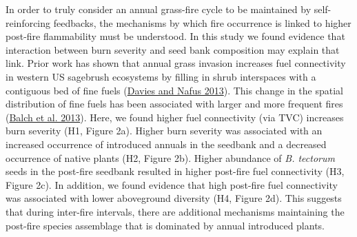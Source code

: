 \documentclass[
  12pt,
]{article}
\begin{document}
In order to truly consider an annual grass-fire cycle to be maintained
by self-reinforcing feedbacks, the mechanisms by which fire occurrence
is linked to higher post-fire flammability must be understood. In this
study we found evidence that interaction between burn severity and seed
bank composition may explain that link. Prior work has shown that annual
grass invasion increases fuel connectivity in western US sagebrush
ecosystems by filling in shrub interspaces with a contiguous bed of fine
fuels (\protect\hyperlink{ref-Davies2013}{Davies and Nafus 2013}). This
change in the spatial distribution of fine fuels has been associated
with larger and more frequent fires
(\protect\hyperlink{ref-Balch2013}{Balch et al. 2013}). Here, we found
higher fuel connectivity (via TVC) increases burn severity (H1, Figure
2a). Higher burn severity was associated with an increased occurrence of
introduced annuals in the seedbank and a decreased occurrence of native
plants (H2, Figure 2b). Higher abundance of \emph{B. tectorum} seeds in
the post-fire seedbank resulted in higher post-fire fuel connectivity
(H3, Figure 2c). In addition, we found evidence that high post-fire fuel
connectivity was associated with lower aboveground diversity (H4, Figure
2d). This suggests that during inter-fire intervals, there are
additional mechanisms maintaining the post-fire species assemblage that
is dominated by annual introduced plants.
\end{document}
